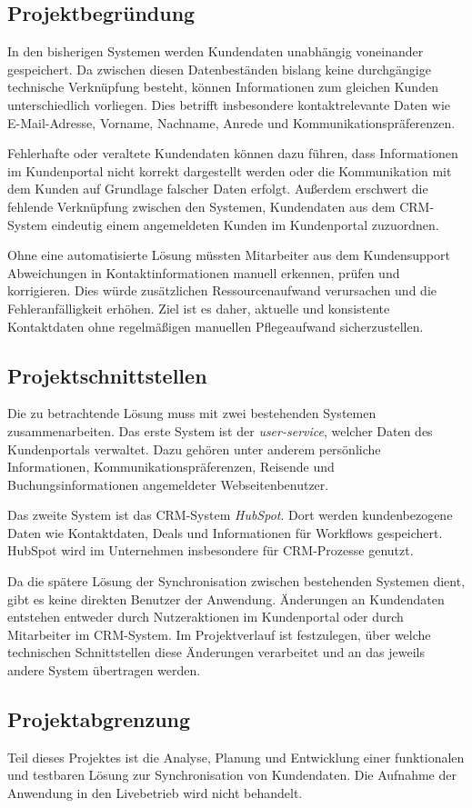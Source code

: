 \subsection{Projektbegründung} 
\label{sec:Projektbegruendung}
In den bisherigen Systemen werden Kundendaten unabhängig voneinander gespeichert.
Da zwischen diesen Datenbeständen bislang keine durchgängige technische Verknüpfung besteht,
können Informationen zum gleichen Kunden unterschiedlich vorliegen.
Dies betrifft insbesondere kontaktrelevante Daten wie E-Mail-Adresse, Vorname, Nachname,
Anrede und Kommunikationspräferenzen.
\par\smallskip
Fehlerhafte oder veraltete Kundendaten können dazu führen,
dass Informationen im Kundenportal nicht korrekt dargestellt werden
oder die Kommunikation mit dem Kunden auf Grundlage falscher Daten erfolgt.
Außerdem erschwert die fehlende Verknüpfung zwischen den Systemen,
Kundendaten aus dem CRM-System eindeutig einem angemeldeten Kunden im Kundenportal zuzuordnen.
\par\smallskip
Ohne eine automatisierte Lösung müssten Mitarbeiter aus dem Kundensupport
Abweichungen in Kontaktinformationen manuell erkennen, prüfen und korrigieren.
Dies würde zusätzlichen Ressourcenaufwand verursachen und die Fehleranfälligkeit erhöhen.
Ziel ist es daher, aktuelle und konsistente Kontaktdaten ohne regelmäßigen manuellen Pflegeaufwand sicherzustellen.


\subsection{Projektschnittstellen} 
\label{sec:Projektschnittstellen}
Die zu betrachtende Lösung muss mit zwei bestehenden Systemen zusammenarbeiten.
Das erste System ist der \textit{user-service}, welcher Daten des Kundenportals verwaltet.
Dazu gehören unter anderem persönliche Informationen, Kommunikationspräferenzen,
Reisende und Buchungsinformationen angemeldeter Webseitenbenutzer.
\par\smallskip
Das zweite System ist das CRM-System \textit{HubSpot}.
Dort werden kundenbezogene Daten wie Kontaktdaten, Deals und Informationen für Workflows gespeichert.
HubSpot wird im Unternehmen insbesondere für CRM-Prozesse genutzt.
\par\smallskip
Da die spätere Lösung der Synchronisation zwischen bestehenden Systemen dient,
gibt es keine direkten Benutzer der Anwendung.
Änderungen an Kundendaten entstehen entweder durch Nutzeraktionen im Kundenportal
oder durch Mitarbeiter im CRM-System.
Im Projektverlauf ist festzulegen, über welche technischen Schnittstellen diese Änderungen verarbeitet
und an das jeweils andere System übertragen werden.


\subsection{Projektabgrenzung} 
\label{sec:Projektabgrenzung}
Teil dieses Projektes ist die Analyse, Planung und Entwicklung einer funktionalen und testbaren Lösung zur Synchronisation von Kundendaten.
Die Aufnahme der Anwendung in den Livebetrieb wird nicht behandelt.